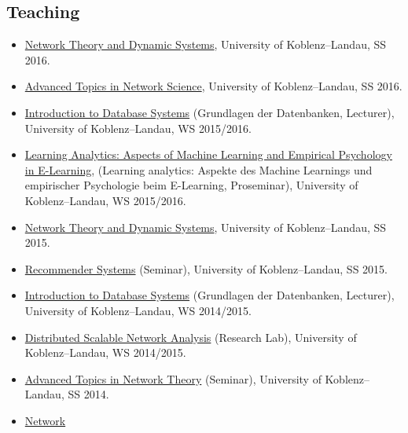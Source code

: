 \documentclass[line,margin]{res}
\begin{document}
\begin{resume}
\section{Teaching}
\begin{itemize}
\item 
  \href{https://west.uni-koblenz.de/en/studying/courses/ss16/network-theory-and-dynamic-systems}{Network
    Theory and Dynamic Systems}, University of Koblenz--Landau, SS 2016.
\item
  \href{https://west.uni-koblenz.de/en/studying/courses/ss16/seminar}{Advanced
    Topics in Network Science}, University of Koblenz--Landau, SS 2016. 
\item
  \href{https://west.uni-koblenz.de/en/studium/lehrveranstaltungen/ws1516/grundlagen-der-datenbanken}{Introduction
    to Database Systems} (Grundlagen der Datenbanken, 
  Lecturer), University of Koblenz--Landau, WS 2015/2016.
\item 
  \href{https://west.uni-koblenz.de/en/studium/lehrveranstaltungen/ws1516/proseminar-learning-analytics}{Learning
  Analytics: Aspects of Machine Learning and Empirical Psychology in E-Learning}, (Learning
    analytics: Aspekte des Machine Learnings und empirischer Psychologie
    beim E-Learning, Proseminar), University of Koblenz--Landau, WS 2015/2016.
\item 
  \href{https://west.uni-koblenz.de/en/studium/lehrveranstaltungen/ss15/network-theory-dynamic-systems}{Network
    Theory and Dynamic Systems}, University of Koblenz--Landau, SS 2015.
\item
  \href{https://west.uni-koblenz.de/en/studium/lehrveranstaltungen/ss15/recommender-systems}{Recommender
    Systems} (Seminar), University of Koblenz--Landau, SS 2015.
\item
  \href{https://web.west.uni-koblenz.de/en/studium/lehrveranstaltungen/ws1415/gddb}{Introduction
    to Database Systems} (Grundlagen der Datenbanken, 
  Lecturer), University of Koblenz--Landau, WS 2014/2015.
\item
  \href{https://web.west.uni-koblenz.de/en/studium/lehrveranstaltungen/ws1415/forschungspraktikum}{Distributed
    Scalable Network Analysis} (Research Lab), University of
  Koblenz--Landau, WS 2014/2015. 
\item
  \href{http://www.uni-koblenz-landau.de/campus-koblenz/fb4/west/teaching/ss14/seminar}{Advanced
    Topics in Network Theory} (Seminar), University of Koblenz--Landau, SS 2014. 
\item 
  \href{http://www.uni-koblenz-landau.de/campus-koblenz/fb4/west/teaching/ss14/network-theory-and-dynamic-systems}{Network
}
\end{itemize}
\end{resume}
\end{document}
